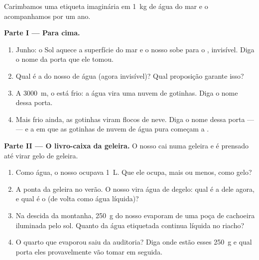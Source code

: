 \begin{problem}\label{pb:g6:water-states:1}
Carimbamos uma etiqueta imaginária em \qty{1}{kg} de água do mar e o
acompanhamos por um ano.

\medskip\noindent\textbf{Parte I --- Para cima.}
\begin{enumerate}
  \item Junho: o Sol aquece a superfície do mar e o nosso 
        sobe para o , invisível. Diga o nome da porta que ele
        tomou.
  \item Qual é a  do nosso  de água (agora invisível)?
        Qual proposição garante isso?
  \item A \qty{3000}{m}, o  está frio: a água vira uma nuvem de
        gotinhas. Diga o nome dessa porta.
  \item Mais frio ainda, as gotinhas viram flocos de neve. Diga o
        nome dessa porta ---  --- e a  em que
        as gotinhas de nuvem de água pura começam a .
\end{enumerate}

\medskip\noindent\textbf{Parte II --- O livro-caixa da geleira.}
O nosso  cai numa geleira e é prensado até virar gelo de
geleira.
\begin{enumerate}[resume]
  \item Como água, o nosso  ocupava \qty{1}{L}. Que 
        ele ocupa, mais ou menos, como gelo?
  \item A ponta da geleira  no verão. O nosso  vira
        água de degelo: qual é a  dele agora, e qual é o 
        (de volta como água líquida)?
  \item Na descida da montanha, \qty{250}{g} do nosso 
        evaporam de uma poça de cachoeira iluminada pelo sol. Quanto
        da água etiquetada continua líquida no riacho?
  \item O quarto que evaporou saiu da auditoria? Diga onde estão
        esses \qty{250}{g} e qual porta eles provavelmente vão tomar
        em seguida.
\end{enumerate}


\end{problem}
